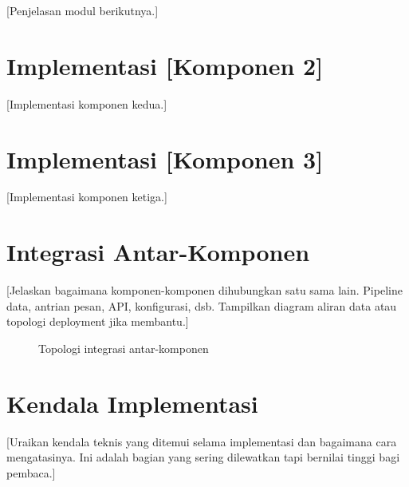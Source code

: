 [Penjelasan modul berikutnya.]

\section{Implementasi [Komponen 2]}
\label{sec:5.3}

[Implementasi komponen kedua.]

\section{Implementasi [Komponen 3]}
\label{sec:5.4}

[Implementasi komponen ketiga.]

\section{Integrasi Antar-Komponen}
\label{sec:5.5}

[Jelaskan bagaimana komponen-komponen dihubungkan satu sama lain. Pipeline data, antrian
pesan, API, konfigurasi, dsb. Tampilkan diagram aliran data atau topologi deployment
jika membantu.]

\begin{figure}[H]
  \centering
  \caption{Topologi integrasi antar-komponen}
  \label{fig:5.integrasi}
\end{figure}

\section{Kendala Implementasi}
\label{sec:5.6}

[Uraikan kendala teknis yang ditemui selama implementasi dan bagaimana cara mengatasinya.
Ini adalah bagian yang sering dilewatkan tapi bernilai tinggi bagi pembaca.]

